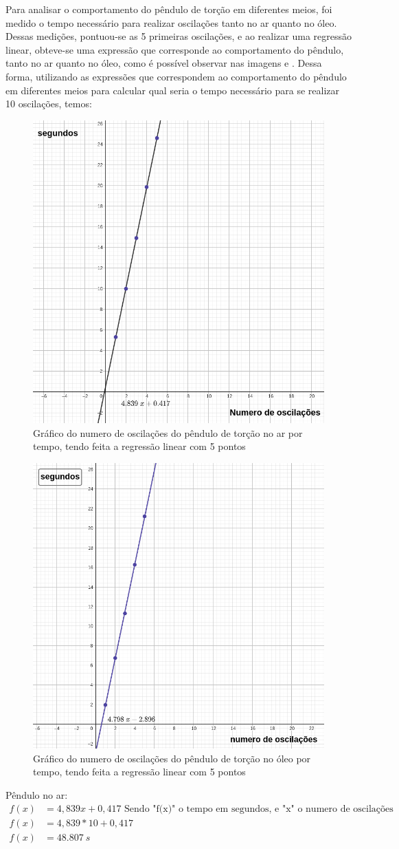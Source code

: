 Para analisar o comportamento do pêndulo de torção em diferentes meios, foi medido o tempo necessário para realizar oscilações tanto no 
ar quanto no óleo. Dessas medições, pontuou-se as 5 primeiras oscilações, e ao realizar uma regressão linear, obteve-se uma expressão que corresponde
ao comportamento do pêndulo, tanto no ar quanto no óleo, como é possível observar nas imagens \label{Troçãonoar} e \label{Torçãonoóleo}.
Dessa forma, utilizando as expressões que correspondem ao comportamento do pêndulo em diferentes meios para calcular qual seria o tempo necessário
para se realizar 10 oscilações, temos:

\begin{figure}[H]
	\centering
	\includegraphics[width=0.35\linewidth]{fig/Torção no ar.png}
	\caption{Gráfico do numero de oscilações do pêndulo de torção no ar por tempo, tendo feita a regressão linear com 5 pontos}
	\label{Torçãonoar}
\end{figure}

\begin{figure}[H]
	\centering
	\includegraphics[width=0.35\linewidth]{fig/Oscilações no óleo.png}
	\caption{Gráfico do numero de oscilações do pêndulo de torção no óleo por tempo, tendo feita a regressão linear com 5 pontos}
	\label{Torçãonoóleo}
\end{figure}

Pêndulo no ar:
\begin{align*}
	f(x) &= 4,839x +  0,417 \text{ Sendo "f(x)" o tempo em segundos, e "x" o numero de oscilações} \\
 	f(x) &= 4,839 * 10 + 0,417\\
    f(x) &= \qty{48,807}{s}	
\end{align*}

